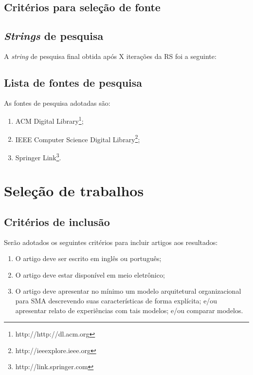 \subsection{Critérios para seleção de fonte}

\subsection{\textit{Strings} de pesquisa}

A \textit{string} de pesquisa final obtida após X iterações da RS foi a seguinte:


\subsection{Lista de fontes de pesquisa}

As fontes de pesquisa adotadas são:
\begin{enumerate}
    \item ACM Digital Library\footnote{http://http://dl.acm.org};
    \item IEEE Computer Science Digital Library\footnote{http://ieeexplore.ieee.org};
    \item Springer Link\footnote{http://link.springer.com}.
\end{enumerate}

\section{Seleção de trabalhos}

\subsection{Critérios de inclusão}

Serão adotados os seguintes critérios para incluir artigos aos resultados:

\begin{enumerate}
    \item O artigo deve ser escrito em inglês ou português;
    \item O artigo deve estar disponível em meio eletrônico;
    \item O artigo deve apresentar no mínimo um modelo arquitetural organizacional para SMA descrevendo suas características de forma explícita; e/ou apresentar relato de experiências com tais modelos; e/ou comparar modelos.
\end{enumerate}

